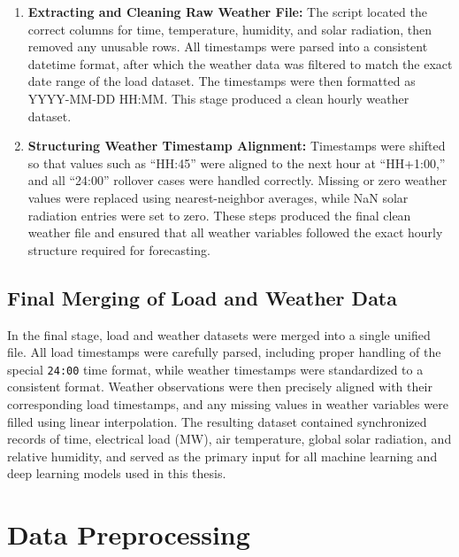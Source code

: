 \documentclass[oneside, 12pt]{book}
\numberwithin{equation}{chapter}
\newcommand{\sizexii}{\fontsize{12pt}{6pt}\selectfont}
\begin{document}
\begin{enumerate}
    \item[a)] \textbf{Extracting and Cleaning Raw Weather File:} The script located the correct columns for time, temperature, humidity, and solar radiation, then removed any unusable rows. All timestamps were parsed into a consistent datetime format, after which the weather data was filtered to match the exact date range of the load dataset. The timestamps were then formatted as YYYY-MM-DD HH:MM. This stage produced a clean hourly weather dataset.
    
    \item[b)] \textbf{Structuring Weather Timestamp Alignment:} Timestamps were shifted so that values such as ``HH:45'' were aligned to the next hour at ``HH+1:00,'' and all ``24:00'' rollover cases were handled correctly. Missing or zero weather values were replaced using nearest-neighbor averages, while NaN solar radiation entries were set to zero. These steps produced the final clean weather file and ensured that all weather variables followed the exact hourly structure required for forecasting.
\end{enumerate}

\subsection{\sizexii Final Merging of Load and Weather Data}

In the final stage, load and weather datasets were merged into a single unified file. All load timestamps were carefully parsed, including proper handling of the special \texttt{24:00} time format, while weather timestamps were standardized to a consistent format. Weather observations were then precisely aligned with their corresponding load timestamps, and any missing values in weather variables were filled using linear interpolation. The resulting dataset contained synchronized records of time, electrical load (MW), air temperature, global solar radiation, and relative humidity, and served as the primary input for all machine learning and deep learning models used in this thesis.

\section{\sizexii Data Preprocessing}
\end{document}
